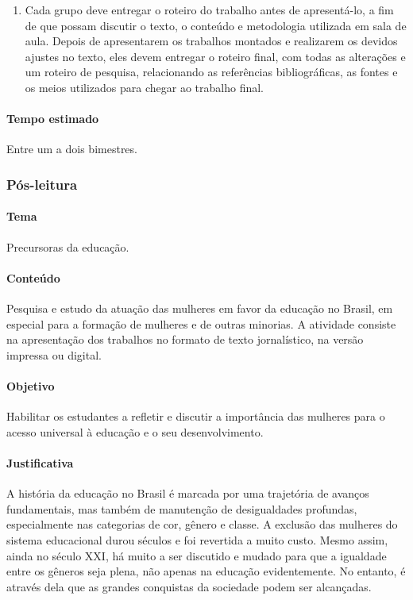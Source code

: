 \documentclass[12pt]{extarticle}
\begin{document}
\begin{enumerate}
\item
Cada grupo deve entregar o roteiro do trabalho antes de apresentá-lo,
a fim de que possam discutir o texto, o conteúdo e metodologia utilizada
em sala de aula. Depois de apresentarem os trabalhos montados e
realizarem os devidos ajustes no texto, eles devem entregar o roteiro
final, com todas as alterações e um roteiro de pesquisa, relacionando as
referências bibliográficas, as fontes e os meios utilizados para chegar
ao trabalho final.
\end{enumerate}

\paragraph{Tempo estimado} Entre um a dois bimestres.



\subsubsection{Pós-leitura}


\paragraph{Tema} Precursoras da educação.

\paragraph{Conteúdo} Pesquisa e estudo da atuação das mulheres em favor da
educação no Brasil, em especial para a formação de mulheres e de outras
minorias. A atividade consiste na apresentação dos trabalhos no formato
de texto jornalístico, na versão impressa ou digital.

\paragraph{Objetivo} Habilitar os estudantes a refletir e discutir a
importância das mulheres para o acesso universal à educação e o seu
desenvolvimento.


\paragraph{Justificativa} A história da educação no Brasil é marcada por
uma trajetória de avanços fundamentais, mas também de manutenção de
desigualdades profundas, especialmente nas categorias de cor, gênero e
classe. A exclusão das mulheres do sistema educacional durou séculos e
foi revertida a muito custo. Mesmo assim, ainda no século \textsc{XX}I, há muito
a ser discutido e mudado para que a igualdade entre os gêneros seja
plena, não apenas na educação evidentemente. No entanto, é através dela
que as grandes conquistas da sociedade podem ser alcançadas.
\end{document}
